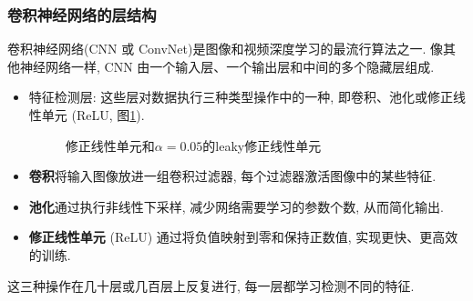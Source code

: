 \subsubsection{卷积神经网络的层结构}
卷积神经网络(CNN 或 ConvNet)是图像和视频深度学习的最流行算法之一.
像其他神经网络一样, CNN 由一个输入层、一个输出层和中间的多个隐藏层组成.
\begin{itemize}
\item 特征检测层: 这些层对数据执行三种类型操作中的一种, 即卷积、池化或修正线性单元 (ReLU, 图\ref{ReLU20200203001}).
\begin{figure}[H]
\begin{center}
\end{center}
\caption{修正线性单元和$\alpha=0.05$的leaky修正线性单元}
\label{ReLU20200203001}
\end{figure}

\item \textbf{卷积}将输入图像放进一组卷积过滤器, 每个过滤器激活图像中的某些特征.
\item \textbf{池化}通过执行非线性下采样, 减少网络需要学习的参数个数, 从而简化输出.
\item \textbf{修正线性单元} (ReLU) 通过将负值映射到零和保持正数值, 实现更快、更高效的训练.
\end{itemize}

这三种操作在几十层或几百层上反复进行, 每一层都学习检测不同的特征.
